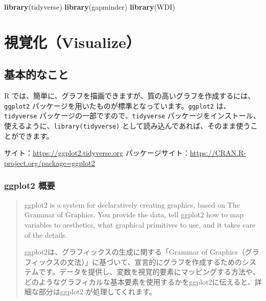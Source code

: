 \documentclass[
  xelatex, ja=standard]{bxjsbook}
\newenvironment{Shaded}{\begin{snugshade}}{\end{snugshade}}
\newcommand{\FunctionTok}[1]{\textcolor[rgb]{0.13,0.29,0.53}{\textbf{#1}}}
\newcommand{\NormalTok}[1]{#1}
\theoremstyle{definition}
\theoremstyle{definition}
\theoremstyle{definition}
\theoremstyle{definition}
\theoremstyle{remark}
\begin{document}
\begin{Shaded}
\begin{Highlighting}[]
\FunctionTok{library}\NormalTok{(tidyverse)}
\FunctionTok{library}\NormalTok{(gapminder)}
\FunctionTok{library}\NormalTok{(WDI)}
\end{Highlighting}
\end{Shaded}

\hypertarget{section}{%
\subsubsection{}\label{section}}

\hypertarget{visualize}{%
\chapter{視覚化（Visualize）}\label{visualize}}

\hypertarget{ux57faux672cux7684ux306aux3053ux3068}{%
\section{基本的なこと}\label{ux57faux672cux7684ux306aux3053ux3068}}

R では、簡単に、グラフを描画できますが、質の高いグラフを作成するには、\texttt{ggplot2} パッケージを用いたものが標準となっています。\texttt{ggplot2} は、\texttt{tidyverse} パッケージの一部ですので、\texttt{tidyverse} パッケージをインストール、使えるように、\texttt{library(tidyverse)} として読み込んであれば、そのまま使うことができます。

サイト：\url{https://ggplot2.tidyverse.org} パッケージサイト：\url{https://CRAN.R-project.org/package=ggplot2}

\hypertarget{ggplot2-ux6982ux8981}{%
\subsection{ggplot2 概要}\label{ggplot2-ux6982ux8981}}

\begin{quote}
ggplot2 is a system for declaratively creating graphics, based on The Grammar of Graphics. You provide the data, tell ggplot2 how to map variables to aesthetics, what graphical primitives to use, and it takes care of the details.

ggplot2は、グラフィックスの生成に関する「Grammar of Graphics（グラフィックスの文法）」に基づいて、宣言的にグラフを作成するためのシステムです。データを提供し、変数を視覚的要素にマッピングする方法や、どのようなグラフィカルな基本要素を使用するかをggplot2に伝えると、詳細な部分はggplot2 が処理してくれます。
\end{quote}
\end{document}

